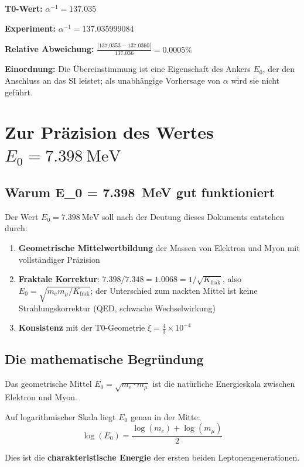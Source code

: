 	\begin{tcolorbox}[colback=green!5!white,colframe=green!75!black,title=Vergleich mit dem Experiment]
		\textbf{T0-Wert:} $\alpha^{-1} = 137.035$
		
		\textbf{Experiment:} $\alpha^{-1} = 137.035999084$
		
		\textbf{Relative Abweichung:} $\frac{|137.0353 - 137.0360|}{137.036} = 0.0005\%$
		
		\textbf{Einordnung:} Die Übereinstimmung ist eine Eigenschaft des Ankers $E_0$, der den Anschluss an das SI leistet; als unabhängige Vorhersage von $\alpha$ wird sie nicht geführt.
	\end{tcolorbox}
	
	\section{Zur Präzision des Wertes $E_0 = \SI{7.398}{\MeV}$}
	
	\subsection{Warum E\_0 = \SI{7.398}{\MeV} gut funktioniert}
	
	Der Wert $E_0 = \SI{7.398}{\MeV}$ soll nach der Deutung dieses Dokuments entstehen durch:
	
	\begin{enumerate}
		\item \textbf{Geometrische Mittelwertbildung} der Massen von Elektron und Myon mit vollständiger Präzision
		\item \textbf{Fraktale Korrektur}: $7.398/7.348 = 1.0068 = 1/\sqrt{K_{\text{frak}}}$, also $E_0 = \sqrt{m_e m_\mu/K_{\text{frak}}}$; der Unterschied zum nackten Mittel ist keine Strahlungskorrektur (QED, schwache Wechselwirkung)
		\item \textbf{Konsistenz} mit der T0-Geometrie $\xi = \frac{4}{3} \times 10^{-4}$
	\end{enumerate}
	
	\subsection{Die mathematische Begründung}
	
	\begin{tcolorbox}[colback=blue!10!white,colframe=blue!75!black,title=Geometrische Interpretation]
		Das geometrische Mittel $E_0 = \sqrt{m_e \cdot m_\mu}$ ist die natürliche Energieskala zwischen Elektron und Myon. 
		
		Auf logarithmischer Skala liegt $E_0$ genau in der Mitte:
		\begin{equation}
			\log(E_0) = \frac{\log(m_e) + \log(m_\mu)}{2}
		\end{equation}
		
		Dies ist die \textbf{charakteristische Energie} der ersten beiden Leptonengenerationen.
	\end{tcolorbox}
	
